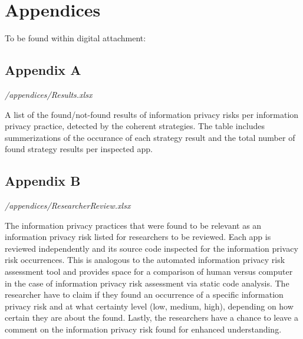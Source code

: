 \section*{Appendices}

To be found within digital attachment:

\subsection*{Appendix A}

\textit{/appendices/Results.xlsx}

A list of the found/not-found results of information privacy risks per information privacy practice, detected by the coherent \AIPRAT strategies.
The table includes summerizations of the occurance of each strategy result and the total number of found strategy results per inspected app.

\subsection*{Appendix B}

\textit{/appendices/ResearcherReview.xlsx}

The information privacy practices that were found to be relevant as an information privacy risk listed for researchers to be reviewed.
Each app is reviewed independently and its source code inspected for the information privacy risk occurrences.
This is analogous to the automated information privacy risk assessment tool and provides space for a comparison of human versus computer in the case of information privacy risk assessment via static code analysis.
The researcher have to claim if they found an occurrence of a specific information privacy risk and at what certainty level (low, medium, high), depending on how certain they are about the found.
Lastly, the researchers have a chance to leave a comment on the information privacy risk found for enhanced understanding.